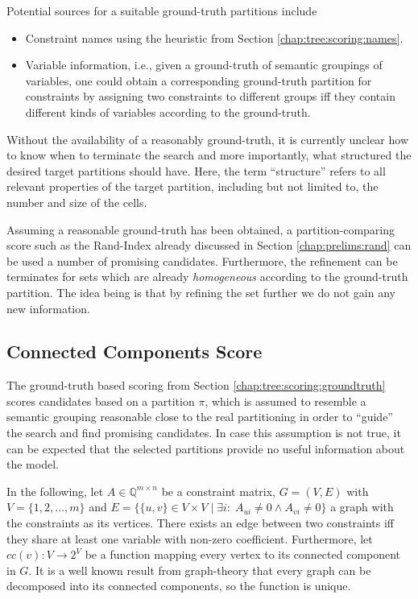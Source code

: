 			Potential sources for a suitable ground-truth partitions include
			\begin{itemize}
				\item Constraint names using the heuristic from Section \ref{chap:tree:scoring:names}. 
				\item Variable information, i.e., given a ground-truth of semantic groupings of variables, one could obtain a corresponding ground-truth partition for constraints by assigning two constraints to different groups iff they contain different kinds of variables according to the ground-truth.
			\end{itemize}
			
			Without the availability of a reasonably ground-truth, it is currently unclear how to know when to terminate the search and more importantly, what structured the desired target partitions should have.
			Here, the term \enquote{structure} refers to all relevant properties of the target partition, including but not limited to, the number and size of the cells.
			
			Assuming a reasonable ground-truth has been obtained, a partition-comparing score such as the Rand-Index already discussed in Section \ref{chap:prelims:rand} can be used a number of promising candidates.
			Furthermore, the refinement can be terminates for sets which are already \textit{homogeneous} according to the ground-truth partition.
			The idea being is that by refining the set further we do not gain any new information.
			
			\clearpage
	
		\subsection{Connected Components Score}
	
			The ground-truth based scoring from Section \ref{chap:tree:scoring:groundtruth} scores candidates based on a partition $\pi$, which is assumed to resemble a semantic grouping reasonable close to the real partitioning in order to \enquote{guide} the search and find promising candidates.
			In case this assumption is not true, it can be expected that the selected partitions provide no useful information about the model.
			
			In the following, let $A \in \mathbb{Q}^{m \times n}$ be a constraint matrix, $G = (V, E)$ with $V = \{ 1, 2, \ldots, m \}$ and $E = \{ \{ u, v \} \in V \times V \mid \exists i: \; A_{ui} \neq 0 \land A_{vi} \neq 0 \}$ a graph with the constraints as its vertices.
			There exists an edge between two constraints iff they share at least one variable with non-zero coefficient.
			Furthermore, let $cc(v): V \xrightarrow{} 2^V$ be a function mapping every vertex to its connected component in $G$.
			It is a well known result from graph-theory that every graph can be decomposed into its connected components, so the function is unique.
			
